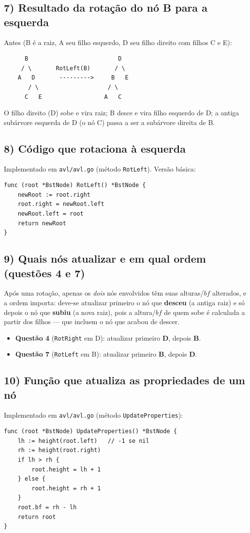 \documentclass[11pt,a4paper]{article}
\begin{document}
\subsection*{7) Resultado da rotação do nó B para a esquerda}
Antes (B é a raiz, A seu filho esquerdo, D seu filho direito com filhos C e E):
\begin{Verbatim}
      B                          D
     / \       RotLeft(B)       / \
    A   D       --------->     B   E
       / \                    / \
      C   E                  A   C
\end{Verbatim}
O filho direito (D) sobe e vira raiz; B desce e vira filho esquerdo de D; a antiga subárvore
esquerda de D (o nó C) passa a ser a subárvore direita de B.

\subsection*{8) Código que rotaciona à esquerda}
Implementado em \texttt{avl/avl.go} (método \texttt{RotLeft}). Versão básica:
\begin{lstlisting}
func (root *BstNode) RotLeft() *BstNode {
    newRoot := root.right
    root.right = newRoot.left
    newRoot.left = root
    return newRoot
}
\end{lstlisting}

\subsection*{9) Quais nós atualizar e em qual ordem (questões 4 e 7)}
Após uma rotação, apenas os \emph{dois} nós envolvidos têm suas alturas/$bf$ alterados, e a
ordem importa: deve-se atualizar primeiro o nó que \textbf{desceu} (a antiga raiz) e só depois
o nó que \textbf{subiu} (a nova raiz), pois a altura/$bf$ de quem sobe é calculada a partir
dos filhos --- que incluem o nó que acabou de descer.
\begin{itemize}[noitemsep]
  \item \textbf{Questão 4} (\texttt{RotRight} em D): atualizar primeiro \textbf{D}, depois \textbf{B}.
  \item \textbf{Questão 7} (\texttt{RotLeft} em B): atualizar primeiro \textbf{B}, depois \textbf{D}.
\end{itemize}

\subsection*{10) Função que atualiza as propriedades de um nó}
Implementado em \texttt{avl/avl.go} (método \texttt{UpdateProperties}):
\begin{lstlisting}
func (root *BstNode) UpdateProperties() *BstNode {
    lh := height(root.left)   // -1 se nil
    rh := height(root.right)
    if lh > rh {
        root.height = lh + 1
    } else {
        root.height = rh + 1
    }
    root.bf = rh - lh
    return root
}
\end{lstlisting}
\end{document}

